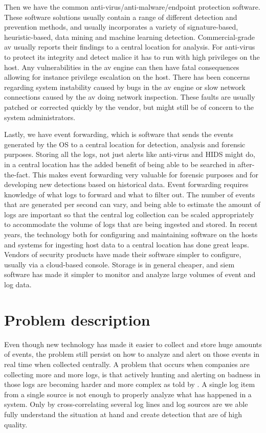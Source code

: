 Then we have the common anti-virus/anti-malware/endpoint protection software. These software solutions usually contain a range of different detection and prevention methods, and usually incorporates a variety of signature-based, heuristic-based, data mining and machine learning detection. Commercial-grade \acrfull{av} usually reports their findings to a central location for analysis. For anti-virus to protect its integrity and detect malice it has to run with high privileges on the host. Any vulnerabilities in the \acrshort{av} engine can then have fatal consequences allowing for instance privilege escalation on the host. There has been concerns regarding system instability caused by bugs in the \acrshort{av} engine or slow network connections caused by the \acrshort{av} doing network inspection. These faults are usually patched or corrected quickly by the vendor, but might still be of concern to the system administrators.

Lastly, we have event forwarding, which is software that sends the events generated by the OS to a central location for detection, analysis and forensic purposes. Storing all the logs, not just alerts like anti-virus and HIDS might do, in a central location has the added benefit of being able to be searched in after-the-fact. This makes event forwarding very valuable for forensic purposes and for developing new detections based on historical data.
Event forwarding requires knowledge of what logs to forward and what to filter out. The number of events that are generated per second can vary, and being able to estimate the amount of logs are important so that the central log collection can be scaled appropriately to accommodate the volume of logs that are being ingested and stored.
In recent years, the technology both for configuring and maintaining software on the hosts and systems for ingesting host data to a central location has done great leaps. Vendors of security products have made their software simpler to configure, usually via a cloud-based console. Storage is in general cheaper, and \acrfull{siem} software has made it simpler to monitor and analyze large volumes of event and log data.

\section{Problem description}
\label{sec:problemdescription}
Even though new technology has made it easier to collect and store huge amounts of events, the problem still persist on how to analyze and alert on those events in real time when collected centrally.
A problem that occurs when companies are collecting more and more logs, is that actively hunting and alerting on badness in those logs are becoming harder and more complex as told by \textcite{Fatemi_2020}. A single log item from a single source is not enough to properly analyze what has happened in a system. Only by cross-correlating several log lines and log sources are we able fully understand the situation at hand and create detection that are of high quality.

